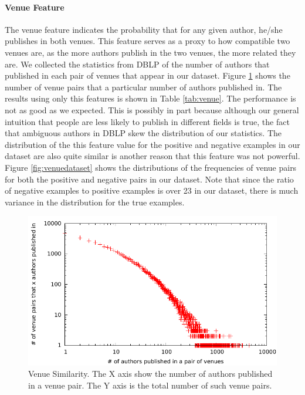 \documentclass[twocolumn,letterpaper]{article}
\begin{document}

\paragraph{Venue Feature} %
\label{par:venue}
The venue feature indicates the probability that for any given author, he/she publishes in both venues.  This feature serves as a proxy to how compatible two venues are, as the more authors publish in the two venues, the more related they are.  We collected the statistics from DBLP of the number of authors that published in each pair of venues that appear in our dataset.  Figure \ref{fig:venue} shows the number of venue pairs that a particular number of authors published in.  The results using only this features is shown in Table \ref{tab:venue}.  The performance is not as good as we expected.  This is possibly in part because although our general intuition that people are less likely to publish in different fields is true, the fact that ambiguous authors in DBLP skew the distribution of our statistics.  The distribution of the this feature value for the positive and negative examples in our dataset are also quite similar is another reason that this feature was not powerful.  Figure \ref{fig:venuedataset} shows the distributions of the frequencies of venue pairs for both the positive and negative pairs in our dataset.  Note that since the ratio of negative examples to positive examples is over 23 in our dataset, there is much variance in the distribution for the true examples.
\begin{figure}
  \centering
  \includegraphics[width=\columnwidth]{venuepair}
  \caption{Venue Similarity.  The X axis show the number of authors published in a venue pair.  The Y axis is the total number of such venue pairs.}
  \label{fig:venue}
\end{figure}
\end{document}
